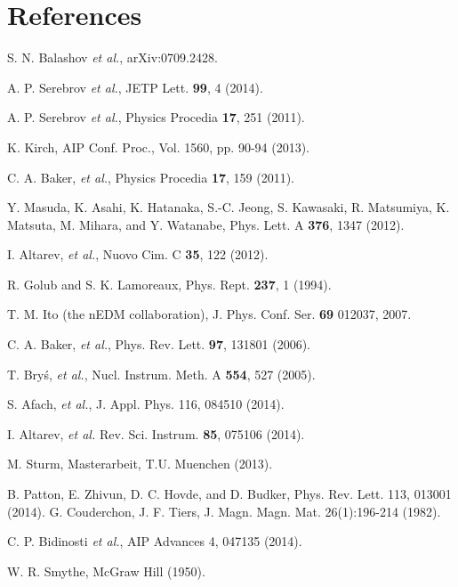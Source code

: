 \documentclass[review]{elsarticle}
\begin{document}
\section*{References}


\begin{thebibliography}{00}

 S. N. Balashov {\it et al.}, arXiv:0709.2428.

 A. P. Serebrov {\it et al.}, JETP Lett. {\bf 99}, 4
  (2014).

 A. P. Serebrov {\it et al.}, Physics Procedia {\bf
  17}, 251 (2011).

 K. Kirch, AIP Conf. Proc., Vol. 1560, pp. 90-94
  (2013).

 C. A. Baker, {\it et al.}, Physics Procedia {\bf
  17}, 159 (2011).

 Y. Masuda, K. Asahi, K. Hatanaka, S.-C. Jeong,
  S. Kawasaki, R. Matsumiya, K. Matsuta, M. Mihara, and Y. Watanabe,
  Phys. Lett. A {\bf 376}, 1347 (2012).

 I. Altarev, {\it et al.}, Nuovo Cim. C {\bf
  35}, 122 (2012).

 R. Golub and S. K. Lamoreaux, Phys. Rept.  {\bf
  237}, 1 (1994).

 T. M. Ito (the nEDM collaboration),
  J. Phys. Conf. Ser. {\bf 69} 012037, 2007.

 C. A. Baker, {\it et al.}, Phys. Rev. Lett. {\bf
  97}, 131801 (2006).

 T. Bry\'s, {\it et al.}, Nucl. Instrum. Meth. A
  {\bf 554}, 527 (2005).

 S. Afach, {\it et al.}, J. Appl. Phys. 116, 084510 (2014).

 I. Altarev, {\it et al.}
  Rev. Sci. Instrum. {\bf 85}, 075106 (2014).

 M. Sturm, Masterarbeit, T.U. Muenchen (2013).

 B. Patton, E. Zhivun, D. C. Hovde, and D. Budker,
  Phys. Rev. Lett. 113, 013001 (2014).
 G. Couderchon, J. F. Tiers, J. Magn. Magn. Mat. 26(1):196-214 (1982).

 C. P. Bidinosti {\it et al.}, AIP Advances 4, 047135 (2014).

 W. R. Smythe, McGraw Hill (1950).


\end{thebibliography}
\end{document}
